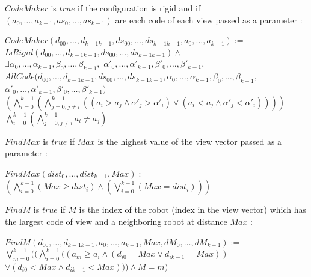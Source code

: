 \documentclass{article}
\begin{document}
$CodeMaker$ is $true$ if the configuration is rigid and if $(a_{0}, \ldots , a_{k-1}, as_{0}, \ldots , as_{k-1})$ are each code of each view passed as a parameter :

\begin{center}
$CodeMaker(d_{00}, \ldots ,d_{k-1k-1}, ds_{00}, \ldots ,ds_{k-1k-1}, a_{0}, \ldots , a_{k-1}):=$\\
$IsRigid(d_{00}, \ldots ,d_{k-1k-1}, ds_{00}, \ldots ,ds_{k-1k-1}) \land $\\
$\exists \alpha_{0}, \dots, \alpha_{k-1}, \beta_{0}, \dots, \beta_{k-1},$
$\alpha'_{0}, \dots, \alpha'_{k-1}, \beta'_{0}, \dots, \beta'_{k-1},$\\
$AllCode(d_{00}, \ldots ,d_{k-1k-1}, ds_{00}, \ldots ,ds_{k-1k-1}, \alpha_{0}, \dots, \alpha_{k-1}, \beta_{0}, \dots, \beta_{k-1}, $\\
$\alpha'_{0}, \dots, \alpha'_{k-1}, \beta'_{0}, \dots, \beta'_{k-1})$\\
$(\bigwedge_{i = 0}^{k-1} (\bigwedge_{j = 0, j\not=i}^{k-1} ((a_{i} > a_{j} \land \alpha'_{j} > \alpha'_{i}) \lor (a_{i} < a_{j} \land \alpha'_{j} < \alpha'_{i}) ) ) )$\\
$\bigwedge_{i=0}^{k-1} (\bigwedge_{j=0, j \not= i}^{k-1} a_{i} \not= a_{j})$
\end{center}

$FindMax$ is $true$ if $Max$ is the highest value of the view vector passed as a parameter :

\begin{center}

$FindMax(dist_{0}, \ldots ,dist_{k-1}, Max):=$\\
$(\bigwedge_{i=0}^{k-1} (Max \geq dist_{i}) \land (\bigvee_{i=0}^{k-1} (Max = dist_{i})))$
\end{center}

$FindM$ is $true$ if $M$ is the index of the robot (index in the view vector) which has the largest code of view and a neighboring robot at distance $Max$ :

\begin{center}

$FindM(d_{00}, \ldots ,d_{k-1k-1}, a_{0}, \ldots , a_{k-1}, Max, dM_{0}, \dots, dM_{k-1}):=$\\
$\bigvee_{m=0}^{k-1}((\bigwedge_{i=0}^{k-1} ((a_{m} \geq a_i \land (d_{i0} = Max \lor d_{ik-1} = Max))$\\
$\lor (d_{i0} < Max \land d_{ik-1} < Max))) \land M = m )$
\end{center}
\end{document}
